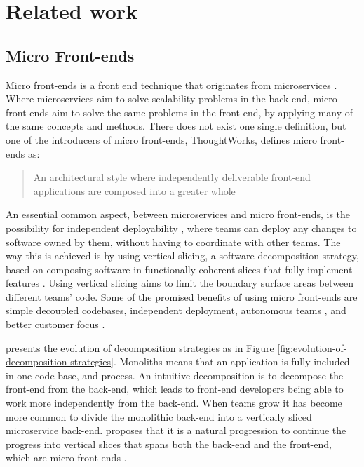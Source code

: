 \chapter{Related work}


\section{Micro Front-ends}

Micro front-ends is a front end technique that originates from microservices \cite{Jackson2019}. Where microservices aim to solve scalability problems in the back-end, micro front-ends aim to solve the same problems in the front-end, by applying many of the same concepts and methods. There does not exist one single definition, but one of the introducers of micro front-ends, ThoughtWorks, defines micro front-ends as: \blockquote{An architectural style where independently deliverable front-end applications are composed into a greater whole \cite{Jackson2019}}

An essential common aspect, between microservices and micro front-ends, is the possibility for independent deployability \cite{Jackson2019}, where teams can deploy any changes to software owned by them, without having to coordinate with other teams. The way this is achieved is by using vertical slicing, a software decomposition strategy, based on composing software in functionally coherent slices that fully implement features \cite[ch.~1]{Geers2020}. Using vertical slicing aims to limit the boundary surface areas between different teams' code. Some of the promised benefits of using micro front-ends are simple decoupled codebases, independent deployment, autonomous teams \cite{Jackson2019}, and better customer focus \cite[ch.~1]{Geers2020}.

\citeauthor{Geers2020} presents the evolution of decomposition strategies as in Figure \ref{fig:evolution-of-decomposition-strategies}. Monoliths means that an application is fully included in one code base, and process. An intuitive decomposition is to decompose the front-end from the back-end, which leads to front-end developers being able to work more independently from the back-end. When teams grow it has become more common to divide the monolithic back-end into a vertically sliced microservice back-end. \citeauthor{Geers2020} proposes that it is a natural progression to continue the progress into vertical slices that spans both the back-end and the front-end, which are micro front-ends \cite{Geers2020}.

